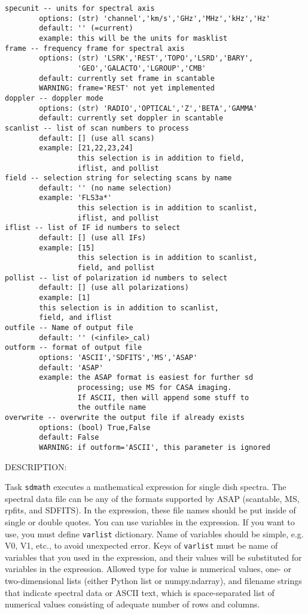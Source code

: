 \begin{verbatim}
specunit -- units for spectral axis
        options: (str) 'channel','km/s','GHz','MHz','kHz','Hz'
        default: '' (=current)
        example: this will be the units for masklist
frame -- frequency frame for spectral axis
        options: (str) 'LSRK','REST','TOPO','LSRD','BARY',
                 'GEO','GALACTO','LGROUP','CMB'
        default: currently set frame in scantable
        WARNING: frame='REST' not yet implemented
doppler -- doppler mode
        options: (str) 'RADIO','OPTICAL','Z','BETA','GAMMA'
        default: currently set doppler in scantable
scanlist -- list of scan numbers to process
        default: [] (use all scans)
        example: [21,22,23,24]
                 this selection is in addition to field,
                 iflist, and pollist
field -- selection string for selecting scans by name
        default: '' (no name selection)
        example: 'FLS3a*'
                 this selection is in addition to scanlist,
                 iflist, and pollist
iflist -- list of IF id numbers to select
        default: [] (use all IFs)
        example: [15]
                 this selection is in addition to scanlist,
                 field, and pollist
pollist -- list of polarization id numbers to select
        default: [] (use all polarizations)
        example: [1]
        this selection is in addition to scanlist,
        field, and iflist
outfile -- Name of output file
        default: '' (<infile>_cal)
outform -- format of output file
        options: 'ASCII','SDFITS','MS','ASAP'
        default: 'ASAP'
        example: the ASAP format is easiest for further sd
                 processing; use MS for CASA imaging.
                 If ASCII, then will append some stuff to
                 the outfile name
overwrite -- overwrite the output file if already exists
        options: (bool) True,False
        default: False
        WARNING: if outform='ASCII', this parameter is ignored
\end{verbatim}

DESCRIPTION:

Task {\tt sdmath} executes a mathematical expression for single dish spectra.
The spectral data file can be any of the formats supported by
ASAP (scantable, MS, rpfits, and SDFITS). In the expression, 
these file names should be put inside of single or double quotes.
You can use variables in the expression. If you want to use, you must
define {\tt varlist} dictionary. Name of variables should be simple, e.g.
V0, V1, etc., to avoid unexpected error. Keys of {\tt varlist} must be name
of variables that you used in the expression, and their values will
be substituted for variables in the expression. Allowed type for value
is numerical values, one- or two-dimensional lists (either Python list
or numpy.ndarray), and filename strings that indicate spectral data
or ASCII text, which is space-separated list of numerical values
consisting of adequate number of rows and columns.
     
